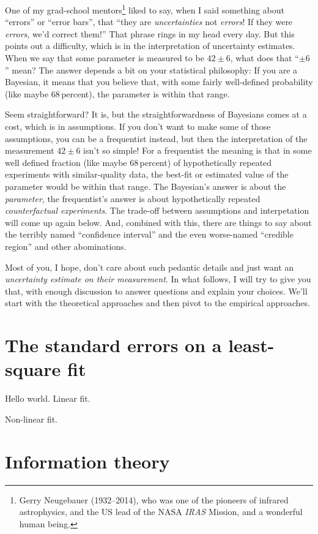 \documentclass[12pt, letterpaper]{article}
\begin{document}
One of my grad-school mentors\footnote{Gerry Neugebauer (1932--2014),
  who was one of the pioneers of infrared astrophysics, and the US
  lead of the NASA \textsl{IRAS} Mission, and a wonderful human
  being.} liked to say, when I said something about ``errors'' or
``error bars'', that ``they are \emph{uncertainties} not
\emph{errors}! If they were \emph{errors}, we'd correct them!'' That
phrase rings in my head every day. But this points out a difficulty,
which is in the interpretation of uncertainty estimates. When we say
that some parameter is measured to be $42\pm 6$, what does that ``$\pm 6$''
mean?  The answer depends a bit on your statistical philosophy:
If you are a Bayesian, it means that you believe that, with some
fairly well-defined probability (like maybe 68\,percent), the
parameter is within that range.

Seem straightforward? It is, but the straightforwardness of Bayesians
comes at a cost, which is in assumptions. If you don't want to make some
of those assumptions, you can be a frequentist instead, but then the
interpretation of the measurement $42\pm 6$ isn't so simple! For a frequentist
the meaning is that in some well defined fraction (like maybe 68\,percent)
of hypothetically repeated experiments with similar-quality data, the
best-fit or estimated value of the parameter would be within that range.
The Bayesian's answer is about the \emph{parameter}, the frequentist's
answer is about hypothetically repeated \emph{counterfactual experiments}.
The trade-off between assumptions and interpetation will come up again below.
And, combined with this, there are things to say about the terribly named
``confidence interval'' and the even worse-named ``credible region'' and other
abominations.

Most of you, I hope, don't care about such pedantic details and just
want an \emph{uncertainty estimate on their measurement}. In what follows,
I will try to give you that, with enough discussion to answer questions
and explain your choices. We'll start with the theoretical approaches and
then pivot to the empirical approaches.

\section{The standard errors on a least-square fit}

Hello world. Linear fit.

Non-linear fit.

\section{Information theory}
\end{document}
